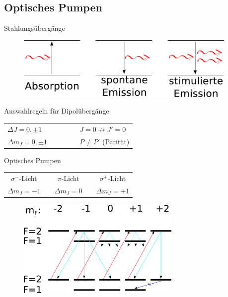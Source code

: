 \documentclass{beamer}
\begin{document}
\subsection{Optisches Pumpen}
\begin{frame}{Stahlungsübergänge}
	\begin{figure}[H]
	\centering \includegraphics[width=0.95\textwidth]{Bilder/Strahlungsuebergaenge.pdf}
	\end{figure}
\begin{block}{Auswahlregeln für Dipolübergänge}
\begin{center}
\begin{tabular}{l c l}
$\Delta J = 0, \pm 1$ & \, \, \, \, \, \, & $J=0 \not\to J'=0$\\
$\Delta m_J = 0, \pm 1$ &  \, \, \, \, \, \,  & $P \neq P'$ (Parität)\\
\end{tabular}
\end{center}
\end{block}
\end{frame}

\begin{frame}{Optisches Pumpen}
\begin{center}
\begin{tabular}{| c c c |} \hline
$\sigma^-$-Licht 	& \,\,\,\,	$\pi$-Licht \,\,\,\,	 	&	\alert{$\sigma^+$-Licht} 	\\
$\Delta m_J = -1$	& \,\,\,\,	$\Delta m_J = 0$ \,\,\,\,	&	\alert{$\Delta m_J = +1$}	\\ \hline
\end{tabular}
\end{center}
	\begin{figure}[H]
	\centering \includegraphics[width=0.7\textwidth]{Bilder/OP87Rb.pdf}
	\end{figure}
\end{frame}
\end{document}
